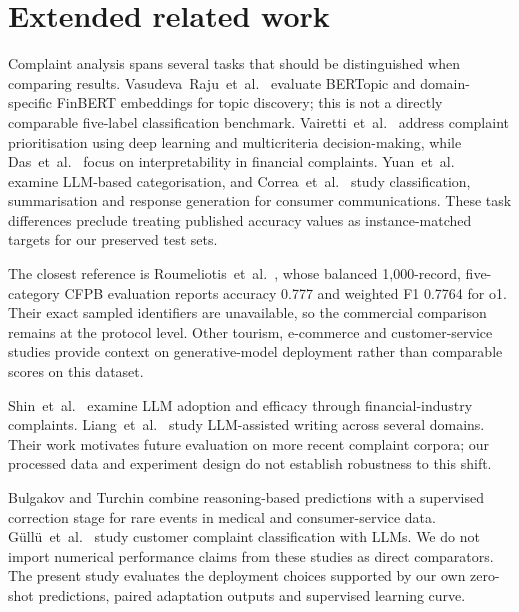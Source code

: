 \documentclass[11pt]{article}
\begin{document}
\section{Extended related work}
Complaint analysis spans several tasks that should be distinguished when
comparing results. Vasudeva~Raju~et~al.\ \cite{raju2022bertopic} evaluate
BERTopic and domain-specific FinBERT embeddings for topic discovery;
this is not a directly comparable five-label classification benchmark.
Vairetti~et~al.\ \cite{vairetti2024bert} address complaint prioritisation
using deep learning and multicriteria decision-making, while Das~et~al.\
\cite{das2024explainable} focus on interpretability in financial complaints.
Yuan~et~al.\ \cite{liu2024framework} examine LLM-based categorisation,
and Correa~et~al.\ \cite{correa2024genai} study classification,
summarisation and response generation for consumer communications.
These task differences preclude treating published accuracy values as
instance-matched targets for our preserved test sets.

The closest reference is Roumeliotis~et~al.\ \cite{roumeliotis2025think},
whose balanced 1,000-record, five-category CFPB evaluation reports
accuracy 0.777 and weighted F1 0.7764 for o1. Their exact sampled
identifiers are unavailable, so the commercial comparison remains
at the protocol level. Other tourism, e-commerce and customer-service
studies \cite{roumeliotis2024tourism,roumeliotis2024ecommerce,
li2024customerservice} provide context on generative-model deployment
rather than comparable scores on this dataset.

Shin~et~al.\ \cite{shin2025llmwritten} examine LLM adoption and efficacy
through financial-industry complaints. Liang~et~al.\ \cite{liang2025cfpb}
study LLM-assisted writing across several domains. Their work motivates
future evaluation on more recent complaint corpora; our processed data
and experiment design do not establish robustness to this shift.

Bulgakov and Turchin \cite{bulgakov2026deepseek} combine reasoning-based
predictions with a supervised correction stage for rare events in medical
and consumer-service data. G{\"u}ll{\"u}~et~al.\ \cite{gullu2025llama}
study customer complaint classification with LLMs. We do not import
numerical performance claims from these studies as direct comparators.
The present study evaluates the deployment choices supported by our
own zero-shot predictions, paired adaptation outputs and supervised
learning curve.



\end{document}
